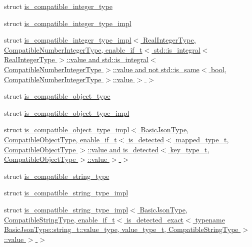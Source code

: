 \begin{DoxyCompactItemize}
\item 
struct \hyperlink{structnlohmann_1_1detail_1_1is__compatible__integer__type}{is\+\_\+compatible\+\_\+integer\+\_\+type}
\item 
struct \hyperlink{structnlohmann_1_1detail_1_1is__compatible__integer__type__impl}{is\+\_\+compatible\+\_\+integer\+\_\+type\+\_\+impl}
\item 
struct \hyperlink{structnlohmann_1_1detail_1_1is__compatible__integer__type__impl_3_01RealIntegerType_00_01Compati3a04243716e8bda67d1ff2aead18da88}{is\+\_\+compatible\+\_\+integer\+\_\+type\+\_\+impl$<$ Real\+Integer\+Type, Compatible\+Number\+Integer\+Type, enable\+\_\+if\+\_\+t$<$ std\+::is\+\_\+integral$<$ Real\+Integer\+Type $>$\+::value and std\+::is\+\_\+integral$<$ Compatible\+Number\+Integer\+Type $>$\+::value and not std\+::is\+\_\+same$<$ bool, Compatible\+Number\+Integer\+Type $>$\+::value $>$ $>$}
\item 
struct \hyperlink{structnlohmann_1_1detail_1_1is__compatible__object__type}{is\+\_\+compatible\+\_\+object\+\_\+type}
\item 
struct \hyperlink{structnlohmann_1_1detail_1_1is__compatible__object__type__impl}{is\+\_\+compatible\+\_\+object\+\_\+type\+\_\+impl}
\item 
struct \hyperlink{structnlohmann_1_1detail_1_1is__compatible__object__type__impl_3_01BasicJsonType_00_01Compatible0bd988932da161d60568f9b7198a50d2}{is\+\_\+compatible\+\_\+object\+\_\+type\+\_\+impl$<$ Basic\+Json\+Type, Compatible\+Object\+Type, enable\+\_\+if\+\_\+t$<$ is\+\_\+detected$<$ mapped\+\_\+type\+\_\+t, Compatible\+Object\+Type $>$\+::value and is\+\_\+detected$<$ key\+\_\+type\+\_\+t, Compatible\+Object\+Type $>$\+::value $>$ $>$}
\item 
struct \hyperlink{structnlohmann_1_1detail_1_1is__compatible__string__type}{is\+\_\+compatible\+\_\+string\+\_\+type}
\item 
struct \hyperlink{structnlohmann_1_1detail_1_1is__compatible__string__type__impl}{is\+\_\+compatible\+\_\+string\+\_\+type\+\_\+impl}
\item 
struct \hyperlink{structnlohmann_1_1detail_1_1is__compatible__string__type__impl_3_01BasicJsonType_00_01Compatible494e9dc742c819c61e54b8282030b5b6}{is\+\_\+compatible\+\_\+string\+\_\+type\+\_\+impl$<$ Basic\+Json\+Type, Compatible\+String\+Type, enable\+\_\+if\+\_\+t$<$ is\+\_\+detected\+\_\+exact$<$ typename Basic\+Json\+Type\+::string\+\_\+t\+::value\+\_\+type, value\+\_\+type\+\_\+t, Compatible\+String\+Type $>$\+::value $>$ $>$}
\item 

\end{DoxyCompactItemize}
